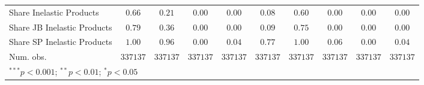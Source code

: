 \begin{tabular}{l c c c c c c c c c}
Share Inelastic Products    & $0.66$        & $0.21$        & $0.00$        & $0.00$        & $0.08$      & $0.60$        & $0.00$        & $0.00$        & $0.00$        \\
Share JB Inelastic Products & $0.79$        & $0.36$        & $0.00$        & $0.00$        & $0.09$      & $0.75$        & $0.00$        & $0.00$        & $0.00$        \\
Share SP Inelastic Products & $1.00$        & $0.96$        & $0.00$        & $0.04$        & $0.77$      & $1.00$        & $0.06$        & $0.00$        & $0.04$        \\
Num. obs.                   & $337137$      & $337137$      & $337137$      & $337137$      & $337137$    & $337137$      & $337137$      & $337137$      & $337137$      \\
\bottomrule
\multicolumn{10}{l}{\scriptsize{$^{***}p<0.001$; $^{**}p<0.01$; $^{*}p<0.05$}}
\end{tabular}

